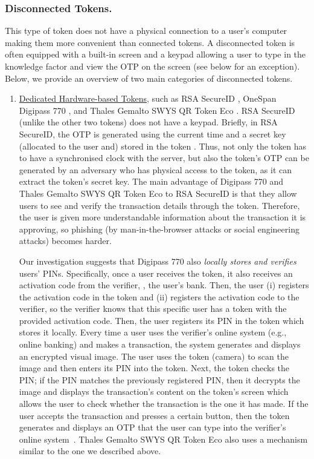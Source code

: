 \subsubsection{Disconnected Tokens.}

This type of token does not have a physical connection to a user's computer making them more convenient than connected tokens. A disconnected token is often equipped with a built-in screen and a keypad allowing a user to type in the knowledge factor and view the OTP on the screen (see below for an exception).  Below, we provide an overview of two main categories of disconnected tokens.

\begin{enumerate}
\item \underline{Dedicated Hardware-based Tokens}, such as RSA SecureID \cite{secureID}, OneSpan Digipass 770 \cite{Digipass-website}, and Thales Gemalto SWYS QR Token Eco \cite{Gemalto}.   RSA SecureID (unlike the other two tokens) does not have a keypad. Briefly, in RSA SecureID, the OTP is generated using the current time and a secret key (allocated to the user and) stored in the token \cite{biryukov2003cryptanalysis}. Thus, not only the token has to have a synchronised clock with the server, but also the token's OTP can be generated by an adversary who has physical access to the token, as it can extract the token's secret key.  The main advantage of  Digipass 770 and Thales Gemalto SWYS QR Token Eco to RSA SecureID is that they allow users to see and verify the transaction details through the token. Therefore, the user is given more understandable information about the transaction it is approving,
so phishing (by man-in-the-browser attacks or social engineering attacks) becomes harder. 

 

Our investigation suggests that Digipass 770 also \emph{locally stores and verifies} users' PINs. 
%
Specifically, once a user receives the token, it also receives an activation code from the verifier, \eg, the user's bank.  Then, the user (i) registers the activation code in the token and (ii) registers the activation code to the verifier, so the verifier knows that this specific user has a token with the provided activation code. Then, the user registers its PIN in the token which stores it locally. Every time a user uses the verifier's online system  (e.g., online banking) and makes a transaction, the system generates and displays an encrypted visual image. The user uses the token (camera) to scan the image and then enters its PIN into the token. Next, the token checks the PIN; if the PIN matches the previously registered PIN, then it decrypts the image and displays the transaction's content on the token's screen which allows the user to check whether the transaction is the one it has made. If the user accepts the transaction and presses a certain button, then the token generates and displays an OTP that the user can type into the verifier's online system~\cite{Digipass-website}.  Thales Gemalto SWYS QR Token Eco also uses a mechanism similar to the one we described above. 


\end{enumerate}
